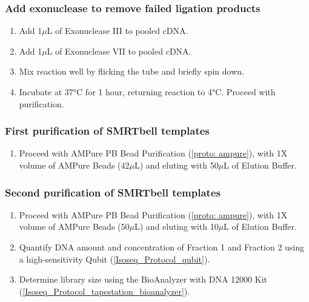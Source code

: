 \subsubsection{Add exonuclease to remove failed ligation products}
\begin{enumerate}
	\item Add 1$\mu$L of Exonuclease III to pooled cDNA. 
	\item Add 1$\mu$L of Exonuclease VII to pooled cDNA.
	\item Mix reaction well by flicking the tube and briefly spin down. 
	\item Incubate at 37°C for 1 hour, returning reaction to 4°C. Proceed with purification. 
\end{enumerate}

\subsubsection{First purification of SMRTbell templates}
\begin{enumerate}
	\item Proceed with AMPure PB Bead Purification (\cref{proto: ampure}), with 1X volume of AMPure Beads (42$\mu$L) and eluting with 50$\mu$L of Elution Buffer.
\end{enumerate} 

\subsubsection{Second purification of SMRTbell templates}
\begin{enumerate}
	\item Proceed with AMPure PB Bead Purification (\cref{proto: ampure}), with 1X volume of AMPure Beads (50$\mu$L) and eluting with 10$\mu$L of Elution Buffer.
	\item Quantify DNA amount and concentration of Fraction 1 and Fraction 2 using a high-sensitivity Qubit (\cref{Isoseq_Protocol_qubit}). 
	\item Determine library size using the BioAnalyzer with DNA 12000 Kit (\cref{Isoseq_Protocol_tapestation_bioanalyzer}). 
\end{enumerate} 
\resumetocwriting